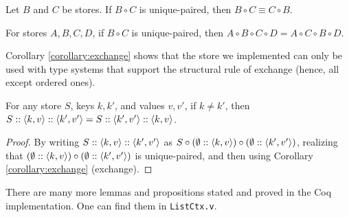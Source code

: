 \begin{theorem}[Commute]
Let $B$ and $C$ be stores. If $B \circ C$ is unique-paired, then $B \circ C \equiv C \circ B$.
\end{theorem}

\begin{corollary}[Exchange]
\label{corollary:exchange}
For stores $A, B, C, D$, if $B \circ C$ is unique-paired, then $A \circ B \circ C \circ D = A \circ C \circ B \circ D$.
\end{corollary}

Corollary \ref{corollary:exchange} shows that the store we implemented can only be used with type systems that support the structural rule of exchange (hence, all except ordered ones).

\begin{lemma}
\label{lemma:append_commut}
For any store $S$, keys $k, k'$, and values $v, v'$, if $k \not= k'$, then $S :: \left\langle k, v \right\rangle :: \left\langle k', v' \right\rangle = S :: \left\langle k', v' \right\rangle :: \left\langle k, v \right\rangle$.
\end{lemma}
\begin{proof}
By writing $S :: \left\langle k, v \right\rangle :: \left\langle k', v' \right\rangle$ as $S \circ (\emptyset :: \left\langle k, v \right\rangle) \circ (\emptyset :: \left\langle k', v' \right\rangle)$, realizing that $(\emptyset :: \left\langle k, v \right\rangle) \circ (\emptyset :: \left\langle k', v' \right\rangle)$ is unique-paired, and then using Corollary \ref{corollary:exchange} (exchange).
\end{proof}

There are many more lemmas and propositions stated and proved in the Coq implementation. One can find them in \texttt{ListCtx.v}.